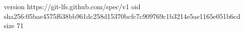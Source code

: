 version https://git-lfs.github.com/spec/v1
oid sha256:05bae4575f638bb961dc258d15370bcfc7c909769c1b3214e5ae1165e051b6cd
size 71
